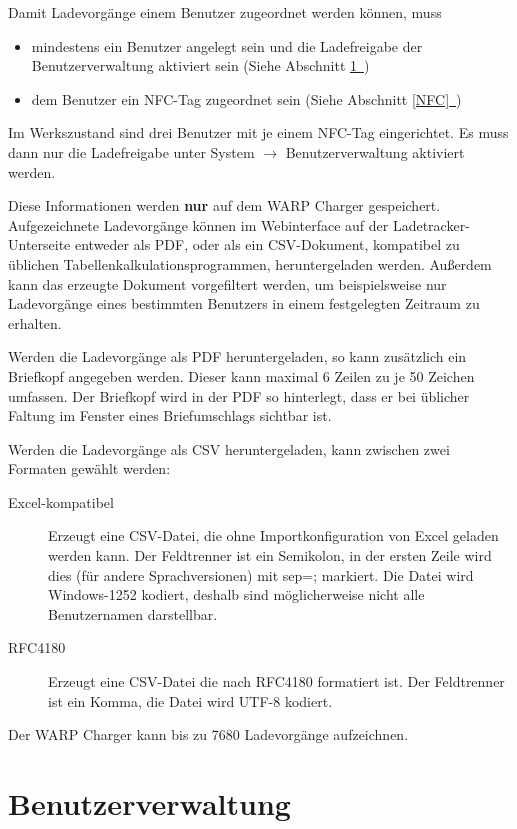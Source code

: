 \documentclass[a4paper,10pt]{article}
\newcommand{\hint}[1]{\begin{tcolorbox}[colback=boxgray,colframe=black,coltext=
white,title=Hinweis,left*=2mm,right*=2mm,boxsep=1mm,bottom=1mm,top=1mm]#1\end{tcolorbox}}
\newcommand*{\fullref}[1]{Abschnitt \hyperref[{#1}]{\ref*{#1}~\nameref*{#1}}}
\begin{document}
\begin{multicols*}{2}
    \hint{Damit Ladevorgänge einem Benutzer zugeordnet werden können, muss
        \begin{itemize}
            \item mindestens ein Benutzer angelegt sein und die Lade­freigabe der Benutzerverwaltung aktiviert sein (Siehe \fullref{user_management})
            \item dem Benutzer ein NFC-Tag zugeordnet sein (Siehe \fullref{NFC})
        \end{itemize}
        Im Werkszustand sind drei Benutzer mit je einem NFC-Tag eingerichtet. Es muss dann nur die Lade­freigabe unter System $\rightarrow$  Benutzerverwaltung aktiviert werden.
    }

    Diese Informationen werden \textbf{nur} auf dem WARP Charger gespeichert.
    Aufgezeichnete Ladevorgänge können im Webinterface auf der Ladetracker-Unterseite entweder als PDF, oder als ein CSV-Dokument,
    kompatibel zu üblichen Tabellenkalkulationsprogrammen, heruntergeladen werden. Außerdem kann das erzeugte Dokument
    vorgefiltert werden, um beispielsweise nur Ladevorgänge eines bestimmten Benutzers in einem festgelegten Zeitraum zu erhalten.

    Werden die Ladevorgänge als PDF heruntergeladen, so kann zusätzlich ein
	Briefkopf angegeben werden. Dieser kann maximal 6 Zeilen zu je 50 Zeichen
    umfassen. Der Briefkopf wird in der PDF so hinterlegt, dass er bei üblicher Faltung im Fenster eines Briefumschlags sichtbar ist.

    Werden die Ladevorgänge als CSV heruntergeladen, kann zwischen zwei Formaten
	gewählt werden:
    \begin{description}
     \item[Excel-kompatibel] Erzeugt eine CSV-Datei, die ohne Importkonfiguration von Excel geladen werden kann. Der Feldtrenner ist ein Semikolon, in der ersten Zeile wird dies (für andere Sprachversionen) mit sep=; markiert. Die Datei wird Windows-1252 kodiert, deshalb sind möglicherweise nicht alle Benutzernamen darstellbar.
     \item[RFC4180] Erzeugt eine CSV-Datei die nach RFC4180 formatiert ist. Der Feldtrenner ist ein Komma, die Datei wird UTF-8 kodiert.
    \end{description}

    Der WARP Charger kann bis zu 7680 Ladevorgänge aufzeichnen.

    \vfill
    \null
    \newpage

    \section{Benutzerverwaltung} \label{user_management}


\end{multicols*}
\end{document}
